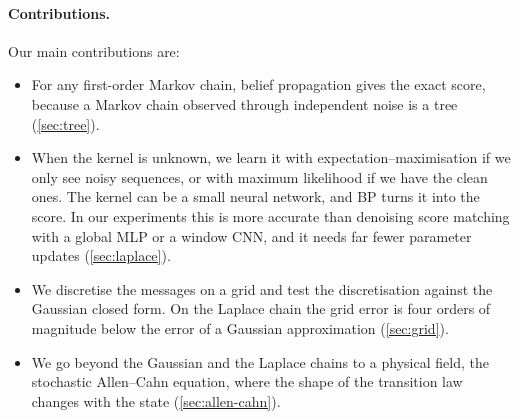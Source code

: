 \paragraph{Contributions.}
Our main contributions are:
\begin{itemize}
\item For any first-order Markov chain, belief propagation gives the exact score, because a Markov chain observed through
  independent noise is a tree (\cref{sec:tree}).
\item When the kernel is unknown, we learn it with expectation--maximisation if we only see noisy sequences, or with
  maximum likelihood if we have the clean ones. The kernel can be a small neural network, and BP turns it into the score.
  In our experiments this is more accurate than denoising score matching with a global MLP or a window CNN, and it needs
  far fewer parameter updates (\cref{sec:laplace}).
\item We discretise the messages on a grid and test the discretisation against the Gaussian closed form. On the Laplace
  chain the grid error is four orders of magnitude below the error of a Gaussian approximation (\cref{sec:grid}).
\item We go beyond the Gaussian and the Laplace chains to a physical field, the stochastic Allen--Cahn equation, where the
  shape of the transition law changes with the state (\cref{sec:allen-cahn}).
\end{itemize}
